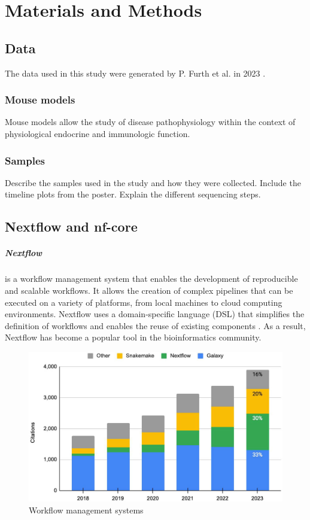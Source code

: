 \chapter{Materials and Methods}

\section{Data}
The data used in this study were generated by P.
Furth et al.
in 2023
\supercite{furth_esr1_2023,furth_overexpression_2023}.

\subsection{Mouse models}
Mouse models allow the study of disease pathophysiology within the context of
physiological endocrine and immunologic function.

\subsection{Samples}
Describe the samples used in the study and how they were collected.
Include the timeline plots from the poster.
Explain the different sequencing steps.

\section{Nextflow and nf-core}
\paragraph{Nextflow} is a workflow management system that enables the
development of reproducible and scalable workflows.
It allows the creation of complex pipelines that can be executed on a variety
of platforms, from local machines to cloud computing environments.
Nextflow uses a domain-specific language (DSL) that simplifies the definition
of workflows and enables the reuse of existing components
\supercite{di_tommaso_nextflow_2017}.
As a result, Nextflow has become a popular tool in the bioinformatics
community.

\begin{figure}[ht]
    \centering

    \includegraphics[width=\textwidth]{chapters/3_materials_and_methods/figures/nextflow_usage.jpg}
    \caption{Workflow management systems} %
    \label{fig:nextflow_usage}
\end{figure}


